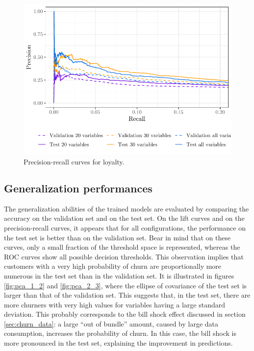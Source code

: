 \begin{figure}
    \centering
    \includegraphics[width=0.9\linewidth]{figures/pr_loy.pdf}
    \caption{Precision-recall curves for loyalty.}
    \label{fig:pr_loy}
\end{figure}

\subsection{Generalization performances}

The generalization abilities of the trained models are evaluated by comparing the
accuracy on the validation set and on the test set. On the lift curves and on
the precision-recall curves, it appears that for all configurations, the
performance on the test set is better than on the validation set. Bear in mind
that on these curves, only a small fraction of the threshold space is
represented, whereas the ROC curves show all possible decision thresholds. This
observation implies that customers with a very high probability of churn are
proportionally more numerous in the test set than in the validation set. It is
illustrated in figures \ref{fig:pca_1_2} and \ref{fig:pca_2_3}, where the
ellipse of covariance of the test set is larger than that of the validation set.
This suggests that, in the test set, there are more churners with very high
values for variables having a large standard deviation. This probably
corresponds to the bill shock effect discussed in section \ref{sec:churn_data}:
a large ``out of bundle'' amount, caused by large data consumption, increases
the probability of churn. In this case, the bill shock is more pronounced in
the test set, explaining the improvement in predictions.

